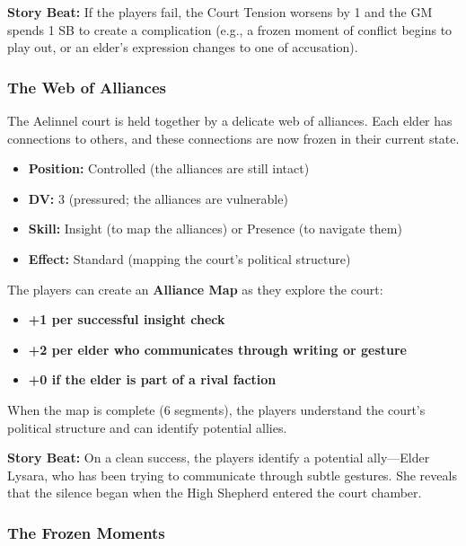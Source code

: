 \documentclass{article}
\begin{document}
\begin{storybox}
\textbf{Story Beat:} If the players fail, the Court Tension worsens by 1 and the GM spends 1 SB to create a complication (e.g., a frozen moment of conflict begins to play out, or an elder's expression changes to one of accusation).
\end{storybox}

\subsubsection{The Web of Alliances}

The Aelinnel court is held together by a delicate web of alliances. Each elder has connections to others, and these connections are now frozen in their current state.

\begin{itemize}
    \item \textbf{Position:} Controlled (the alliances are still intact)
    \item \textbf{DV:} 3 (pressured; the alliances are vulnerable)
    \item \textbf{Skill:} Insight (to map the alliances) or Presence (to navigate them)
    \item \textbf{Effect:} Standard (mapping the court's political structure)
\end{itemize}

The players can create an \textbf{Alliance Map} as they explore the court:

\begin{itemize}
    \item \textbf{+1 per successful insight check}
    \item \textbf{+2 per elder who communicates through writing or gesture}
    \item \textbf{+0 if the elder is part of a rival faction}
\end{itemize}

When the map is complete (6 segments), the players understand the court's political structure and can identify potential allies.

\begin{storybox}
\textbf{Story Beat:} On a clean success, the players identify a potential ally---Elder Lysara, who has been trying to communicate through subtle gestures. She reveals that the silence began when the High Shepherd entered the court chamber.
\end{storybox}

\subsubsection{The Frozen Moments}
\end{document}
